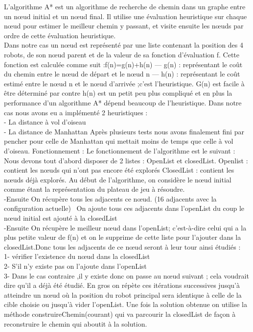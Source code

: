\documentclass[12pt]{article}
\begin{document}
		L’algorithme A* est un algorithme de recherche de chemin dans un graphe entre un nœud initial et un nœud final. Il utilise une évaluation heuristique sur chaque nœud pour estimer le meilleur chemin y passant, et visite ensuite les nœuds par ordre de cette évaluation heuristique.
		\\Dans notre cas un nœud est représenté par une liste contenant la position des 4 robots, de son nœud parent et de la valeur de sa fonction d’évaluation f.
		Cette fonction est calculée comme suit :f(n)=g(n)+h(n)
		— g(n) : représentant le coût du chemin entre le nœud de départ et le nœud n
		— h(n) : représentant le coût estimé entre le nœud n et le nœud d’arrivée ;c’est l’heuristique.
		G(n) est facile à être déterminé par contre h(n) est un petit peu plus compliqué et en plus la performance d’un algorithme A* dépend beaucoup de l’heuristique.
		Dans notre cas nous avons eu a implémenté 2 heuristiques :
		\\-  La distance à vol d’oiseau
		\\-  La distance de Manhattan
		Après plusieurs tests nous avons finalement fini par pencher pour celle de Manhattan qui mettait moins de temps que celle à vol d’oiseau.
		Fonctionnement : Le fonctionnement de l’algorithme est le suivant : Nous devons tout d’abord disposer de 2 listes : OpenList et closedList.
		Openlist : contient les nœuds qui n’ont pas encore été explorés
		ClosedList : contient les nœuds déjà explorés.
		Au début de l’algorithme, on considère le nœud initial comme étant la représentation du plateau de jeu à résoudre.
		\\-Ensuite On récupère tous les adjacents ce nœud. (16 adjacents avec la configuration actuelle)
		\		\-On ajoute tous ces adjacents dans l’openList du coup le nœud initial est ajouté à la closedList
		\\-Ensuite On récupère le meilleur nœud dans l’openList; c’est-à-dire celui qui a la plus petite valeur de f(n) et on  le supprime de cette liste pour l’ajouter dans la closedList.Donc tous les adjacents de ce nœud seront  à leur tour ainsi étudiés :
		           \\ 1-  vérifier l’existence du nœud dans la closedList
		           \\2-  S’il n’y existe pas on l’ajoute dans l’openList
		          \\ 3-  Dans le cas contraire ,il y  existe donc on passe au nœud suivant ; cela voudrait dire qu’il a déjà été étudié.
		En gros on répète ces itérations successives jusqu’à atteindre un nœud où la position du robot principal sera identique à celle de la cible choisie ou jusqu’à vider l’openList.
		Une fois la solution obtenue on utilise la méthode construireChemin(courant) qui va parcourir la closedList de façon à reconstruire le chemin qui aboutit à la solution.  
		
\end{document}
